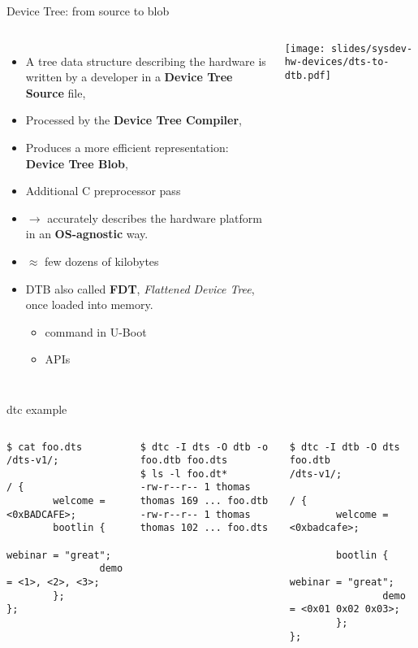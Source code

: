 \begin{frame}{Device Tree: from source to blob}
  \begin{columns}[T]
    \begin{itemize}
    \item A tree data structure describing the hardware is written by a
      developer in a {\bf Device Tree Source} file, 
    \item Processed by the {\bf Device Tree Compiler}, 
    \item Produces a more efficient representation: {\bf Device Tree
        Blob}, 
    \item Additional C preprocessor pass
    \item {} $\rightarrow$ accurately describes the hardware platform in an {\bf OS-agnostic} way.
    \item {} $\approx$ few dozens of kilobytes
    \item DTB also called {\bf FDT}, {\em Flattened Device Tree}, once
      loaded into memory.
      \begin{itemize}
      \item {} command in U-Boot
      \item {} APIs
      \end{itemize}
    \end{itemize}
    \texttt{[image: slides/sysdev-hw-devices/dts-to-dtb.pdf]}
  \end{columns}
\end{frame}

\begin{frame}[fragile]{dtc example}
  \tiny
  \begin{columns}[t]
    \begin{block}{}
\begin{verbatim}
$ cat foo.dts
/dts-v1/;

/ {
        welcome = <0xBADCAFE>;
        bootlin {
                webinar = "great";
                demo = <1>, <2>, <3>;
        };
};
\end{verbatim}
    \end{block}
    \pause
    \begin{block}{}
\begin{verbatim}
$ dtc -I dts -O dtb -o foo.dtb foo.dts
$ ls -l foo.dt*
-rw-r--r-- 1 thomas thomas 169 ... foo.dtb
-rw-r--r-- 1 thomas thomas 102 ... foo.dts
\end{verbatim}
    \end{block}
    \pause
    \begin{block}{}
\begin{verbatim}
$ dtc -I dtb -O dts foo.dtb
/dts-v1/;

/ {
        welcome = <0xbadcafe>;

        bootlin {
                webinar = "great";
                demo = <0x01 0x02 0x03>;
        };
};
\end{verbatim}
    \end{block}
  \end{columns}
\end{frame}

